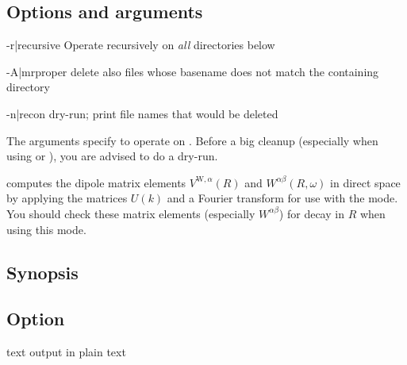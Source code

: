 \begin{usage}
\end{usage}

\subsection{Options and arguments}

\begin{options}
\item [-r|\td recursive] Operate recursively on \emph{all} directories
  below
\item [-A|\td mrproper] delete also files whose basename does not
  match the containing directory
\item [-n|\td recon] dry-run; print file names that would be deleted
\end{options}
%
The arguments specify  to operate on
.  Before a big cleanup (especially when
using  or ), you are advised to do a dry-run.



\compvr computes the dipole matrix elements $V^{\text{W},α}(R)$ and
$W^{αβ}(R, ω)$ in direct space by applying the matrices $U(k)$ and a
Fourier transform for use with the  mode.  You should
check these matrix elements (especially $W^{αβ}$) for decay in $R$
when using this mode.

\subsection{Synopsis}
\begin{usage}
  \compvr [\td text] \case
\end{usage}

\subsection{Option}
\begin{options}
\item [\td text] output  in plain text
\end{options}

